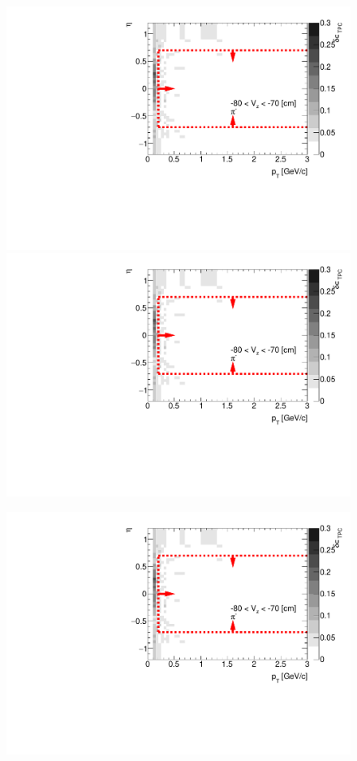 \begin{figure}[H]
{		\includegraphics[width=\linewidth,page=75]{graphics/systematicsEfficiency/deadMaterial/secondaries_Unbinned_SD_.pdf}
		\includegraphics[width=\linewidth,page=78]{graphics/systematicsEfficiency/deadMaterial/secondaries_Unbinned_SD_.pdf}\\
	}%
	\parbox{0.325\textwidth}{
		\includegraphics[width=\linewidth,page=67]{graphics/systematicsEfficiency/deadMaterial/secondaries_Unbinned_SD_.pdf}\\
}
\end{figure}
